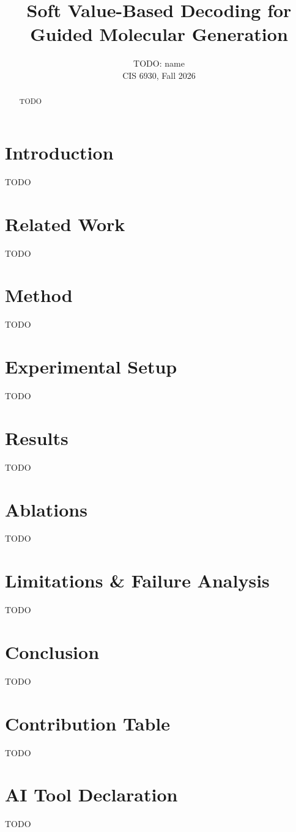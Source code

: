 \documentclass[10pt]{article}
\title{Soft Value-Based Decoding for Guided Molecular Generation}
\author{TODO: name \\ CIS 6930, Fall 2026}
\date{}
\begin{document}
\maketitle
\begin{abstract}TODO\end{abstract}
\section{Introduction}TODO
\section{Related Work}TODO~\cite{li2024svdd,vignac2023digress,black2024ddpo}
\section{Method}TODO
\section{Experimental Setup}TODO
\section{Results}TODO %
\section{Ablations}TODO
\section{Limitations \& Failure Analysis}TODO
\section{Conclusion}TODO
\section*{Contribution Table}TODO
\section*{AI Tool Declaration}TODO


\end{document}
